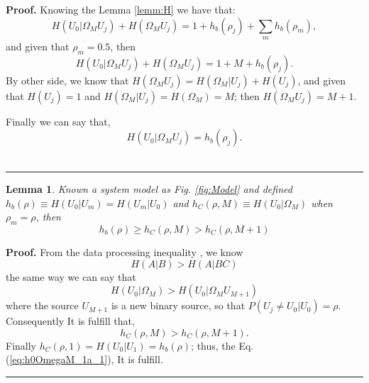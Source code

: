 \documentclass[a4paper,10pt]{article}
\newtheorem{mylemma}[mytheorem]{Lemma}
\newenvironment{myproof}[1][Proof]{\textbf{#1.} }{\ \rule{0.5em}{0.5em}}
\begin{document}
\begin{myproof}
 \label{proof:h0OmegaM_1}
 Knowing the Lemma \ref{lemm:H} we have that:
\begin{equation}\label{eq:h0OmegaM_1_b}
H(U_0|\Omega_M U_j) +H( \Omega_M U_j)=1 + h_{b}(\rho_j)+ \sum \limits_m h_{b}(\rho_m),
\end{equation}
and given that $\rho_m=0.5$, then
\begin{equation}\label{eq:h0OmegaM_1_b2}
H(U_0|\Omega_M U_j) +H( \Omega_M U_j)=1 + M + h_{b}(\rho_j).
\end{equation}
By other side, we know that $H( \Omega_M U_j)=H( \Omega_M|U_j)+H(U_j)$,
and given that $H(U_j)=1$ and $H( \Omega_M|U_j)=H( \Omega_M)=M$;
then $H( \Omega_M U_j)=M+1$.

Finally we can say that,
\begin{equation}\label{eq:h0OmegaM_1_c}
H(U_0|\Omega_M U_j) = h_{b}(\rho_j).
\end{equation}
\end{myproof}



\begin{mdframed}[style=MDFStyGrayScreen]
\begin{mylemma}
 \label{lemm:h0OmegaM_1a}
 Known a system model as Fig. \ref{fig:Model} and defined $h_{b}(\rho) \equiv H(U_0|U_m)=H(U_m|U_0)$ and 
 $h_{C}(\rho,M)\equiv H(U_0|\Omega_M)$ when $\rho_m=\rho$, then
  \begin{equation}\label{eq:h0OmegaM_1a_1}
h_{b}(\rho) \geq h_{C}(\rho,M) > h_{C}(\rho,M+1)
\end{equation}
\end{mylemma}
\end{mdframed}

\begin{myproof}\label{proof:h0OmegaM_1a}
From the data processing inequality \cite{dpi}, we know
 \begin{equation}
  H(A|B) >  H(A|BC)
 \end{equation}
 the same way we can say that
 \begin{equation}
  H(U_0|\Omega_M) >  H(U_0|\Omega_M U_{M+1})
 \end{equation}
 where the source $U_{M+1}$ is a new binary source, so that $P(U_j\neq U_0|U_0)=\rho$.
 Consequently It is fulfill that,
 \begin{equation}\label{eq:h0OmegaM_1a_2}
h_{C}(\rho,M) > h_{C}(\rho,M+1).
\end{equation}
Finally $h_{C}(\rho,1)=H(U_0|U_1)=h_{b}(\rho)$; thus, the Eq. (\ref{eq:h0OmegaM_1a_1}), It is fulfill.
\end{myproof}
\end{document}
